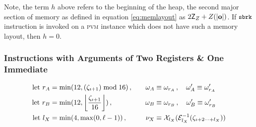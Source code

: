 Note, the term $h$ above refers to the beginning of the heap, the second major section of memory as defined in equation \ref{eq:memlayout} as $2\mathsf{Z}_Z + \rnq{\len{\mathbf{o}}}$. If $\text{{\small \texttt{sbrk}}}$ instruction is invoked on a \textsc{pvm} instance which does not have such a memory layout, then $h = 0$.

\subsubsection{Instructions with Arguments of Two Registers \& One Immediate}
\begin{equation}
\begin{aligned}
  \using r_A &= \min(12, (\instructions_{\imath+1}) \bmod 16) \,,\quad&
  \reg_A &\equiv \reg_{r_A} \,,\quad
  \reg'_A \equiv \reg'_{r_A} \\
  \using r_B &= \min(12, \ffrac{\instructions_{\imath+1}}{16}) \,,\quad&
  \reg_B &\equiv \reg_{r_B} \,,\quad
  \reg'_B \equiv \reg'_{r_B} \\
  \using l_X &= \min(4, \max(0, \ell - 1)) \,,\quad&
  \immed_X &\equiv \sext_{l_X}(\de_{l_X}(\instructions\subrange{\imath+2}{l_X}))
\end{aligned}
\end{equation}

